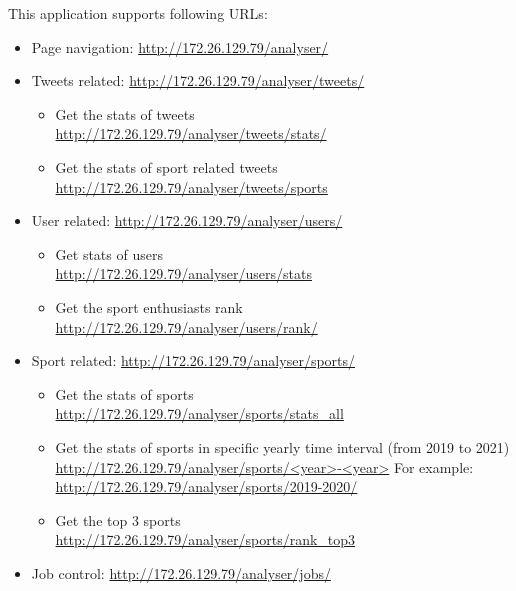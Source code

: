 This application supports following URLs:
\begin{itemize}
    \item Page navigation: \url{http://172.26.129.79/analyser/}
    \item Tweets related: \url{http://172.26.129.79/analyser/tweets/}
    \begin{itemize}
        \item Get the stats of tweets\\
        \url{http://172.26.129.79/analyser/tweets/stats/}
        \item Get the stats of sport related tweets\\
        \url{http://172.26.129.79/analyser/tweets/sports}
    \end{itemize}
    \item User related: \url{http://172.26.129.79/analyser/users/}
    \begin{itemize}
        \item Get stats of users\\
        \url{http://172.26.129.79/analyser/users/stats}
        \item Get the sport enthusiasts rank\\
        \url{http://172.26.129.79/analyser/users/rank/}
    \end{itemize}
    \item Sport related: \url{http://172.26.129.79/analyser/sports/}
    \begin{itemize}
        \item Get the stats of sports\\
        \url{http://172.26.129.79/analyser/sports/stats_all}
        \item Get the stats of sports in specific yearly time interval (from 2019 to 2021)\\
        \url{http://172.26.129.79/analyser/sports/<year>-<year>}
        For example: \url{http://172.26.129.79/analyser/sports/2019-2020/}
        \item Get the top 3 sports\\
        \url{http://172.26.129.79/analyser/sports/rank_top3}
    \end{itemize}
    \item Job control: \url{http://172.26.129.79/analyser/jobs/}
    \begin{itemize}

\end{itemize}
\end{itemize}
